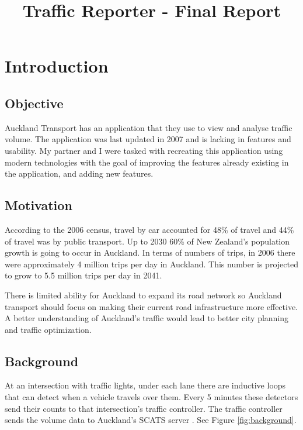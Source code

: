 \documentclass{article}
\title{Traffic Reporter - Final Report}
\begin{document}


\maketitle

\begin{abstract}

\end{abstract}

\section{Introduction}
\subsection{Objective}
Auckland Transport has an application that they use to view and analyse traffic volume. The application was last updated in 2007 and is lacking in features and usability. My partner and I were tasked with recreating this application using modern technologies with the goal of improving the features already existing in the application, and adding new features.

\subsection{Motivation}
According to the 2006 census, travel by car accounted for 48\% of travel and 44\% of travel was by public transport. Up to 2030 60\% of New Zealand's population growth is going to occur in Auckland. In terms of numbers of trips, in 2006 there were approximately 4 million trips per day in Auckland. This number is projected to grow to 5.5 million trips per day in 2041.

There is limited ability for Auckland to expand its road network so Auckland transport should focus on making their current road infrastructure more effective. A better understanding of Auckland's traffic would lead to better city planning and traffic optimization.

\subsection{Background}

At an intersection with traffic lights, under each lane there are inductive loops that can detect when a vehicle travels over them. Every 5 minutes these detectors send their counts to that intersection's traffic controller. The traffic controller sends the volume data to Auckland's SCATS server \cite{sims1981scat}. See Figure \ref{fig:background}. 
\end{document}
